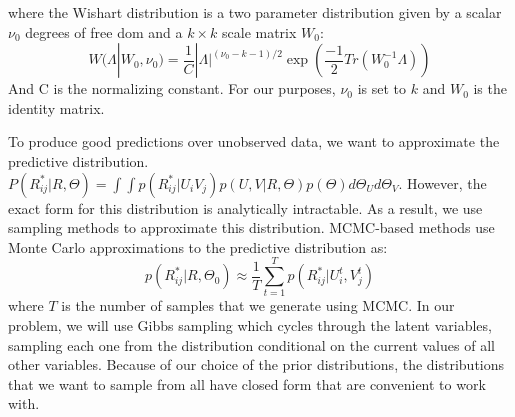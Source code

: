 \documentclass[journal,onecolumn]{IEEEtran}
\begin{document}
where the Wishart distribution is a two parameter distribution given by a scalar $ \nu_0 $ degrees of free dom and a $ k \times k $ scale matrix $ W_0 $:
\begin{equation*}
	W(\Lambda|W_0, \nu_0) = \frac{1}{C}|\Lambda|^{(\nu_0-k-1)/2} \exp(\frac{-1}{2}Tr(W_0^{-1}\Lambda))
\end{equation*}
And C is the normalizing constant. For our purposes, $ \nu_0 $ is set to $ k $ and $ W_0 $ is the identity matrix.

To produce good predictions over unobserved data, we want to approximate the predictive distribution. $ P(R^*_{ij}|R, \Theta) =\int\int p(R^*_{ij}|U_i V_j) p(U, V| R, \Theta) p(\Theta) d\Theta_U d\Theta_V $. However, the exact form for this distribution is analytically intractable. As a result, we use sampling methods to approximate this distribution. MCMC-based methods use Monte Carlo approximations to the predictive distribution as:
\begin{equation*}
	p(R^*_{ij}|R, \Theta_0) \approx \frac{1}{T}\overset{T}{\underset{t=1}{\sum}} p(R^*_{ij}|U_i^t, V_j^t)
\end{equation*}
where $ T $ is the number of samples that we generate using MCMC. In our problem, we will use Gibbs sampling which cycles through the latent variables, sampling each one from the distribution conditional on the current values of all other variables. Because of our choice of the prior distributions, the distributions that we want to sample from all have closed form that are convenient to work with.
\end{document}
